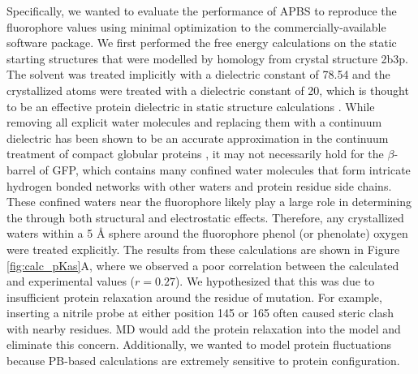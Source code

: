 Specifically, we wanted to evaluate the performance of APBS to reproduce the fluorophore \pKa{} values using minimal optimization to the commercially-available software package. 
We first performed the free energy calculations on the static starting structures that were modelled by homology from crystal structure 2b3p. 
The solvent was treated implicitly with a dielectric constant of 78.54 and the crystallized atoms were treated with a dielectric constant of 20, which is thought to be an effective protein dielectric in static structure calculations \cite{Mehler1999}.
While removing all explicit water molecules and replacing them with a continuum dielectric has been shown to be an accurate approximation in the continuum treatment of compact globular proteins \cite{Kukic2013, Simonson1996}, it may not necessarily hold for the $\beta$-barrel of GFP, which contains many confined water molecules that form intricate hydrogen bonded networks with other waters and protein residue side chains. These confined waters near the fluorophore likely play a large role in determining the \pKa{} through both structural and electrostatic effects.
Therefore, any crystallized waters within a 5 \si{\angstrom} sphere around the fluorophore phenol (or phenolate) oxygen were treated explicitly.
The results from these calculations are shown in Figure \ref{fig:calc_pKas}A, where we observed a poor correlation between the calculated and experimental \pKa{} values ($r = 0.27$).
We hypothesized that this was due to insufficient protein relaxation around the residue of mutation.
For example, inserting a nitrile probe at either position 145 or 165 often caused steric clash with nearby residues.
MD would add the protein relaxation into the model and eliminate this concern.
Additionally, we wanted to model protein fluctuations because PB-based calculations are extremely sensitive to protein configuration.

